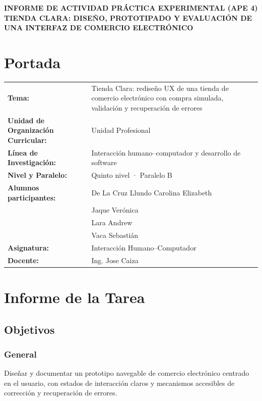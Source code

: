 \documentclass{article}
\begin{document}
\begin{center}
    {\large \textbf{INFORME DE ACTIVIDAD PRÁCTICA EXPERIMENTAL (APE 4)}} \\[0.15cm]
    {\normalsize \textbf{TIENDA CLARA: DISEÑO, PROTOTIPADO Y EVALUACIÓN DE UNA INTERFAZ DE COMERCIO ELECTRÓNICO}} \\    
\end{center}

\vspace{0.2cm}

\section{Portada}
\begin{flushleft}
\renewcommand{\arraystretch}{1.25}
\begin{tabular}{ l p{11.5cm} }
    \textbf{Tema:} & Tienda Clara: rediseño UX de una tienda de comercio electrónico con compra simulada, validación y recuperación de errores \\
    \textbf{Unidad de Organización Curricular:} & Unidad Profesional \\
    \textbf{Línea de Investigación:} & Interacción humano–computador y desarrollo de software \\
    \textbf{Nivel y Paralelo:} & Quinto nivel · Paralelo B \\
    \textbf{Alumnos participantes:} & De La Cruz Llundo Carolina Elizabeth \\
    & Jaque Verónica \\
    & Lara Andrew \\
    & Vaca Sebastián \\
    \textbf{Asignatura:} & Interacción Humano–Computador \\
    \textbf{Docente:} & Ing. Jose Caiza \\
\end{tabular}
\end{flushleft}

\vspace{0.3cm}

\section{Informe de la Tarea}

\subsection{Objetivos}
\subsubsection{General}
Diseñar y documentar un prototipo navegable de comercio electrónico centrado en el usuario, con estados de interacción claros y mecanismos accesibles de corrección y recuperación de errores.
\end{document}
